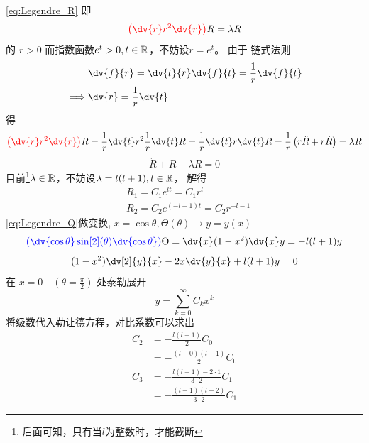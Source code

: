 \cref{eq:Legendre_R} 即
\begin{equation}
  \red{\left(\dv{r} r^2 \dv{r} \right) } R = \lambda R 
\end{equation}
的 $r> 0$ 而指数函数\(e^t>0, t\in {\mathbb{R}}\)，不妨设\(r=e^t\)。
由于
链式法则
\begin{equation}
  \begin{aligned}
  &\dv{f}{r}= \dv{t}{r} \dv{f}{t} = \frac{1}{r} \dv{f}{t} \\
  \implies &\dv{r}=\frac{1}{r} \dv{t}
  \end{aligned}
\end{equation}
得
\begin{equation}
  \red{\left(\dv{r} r^2 \dv{r} \right) } R=
\frac{1}{r} \dv{t} r^2 \frac{1}{r} \dv{t} R
=
\frac{1}{r} \dv{t} r\dv{t} R
= \frac{1}{r} \left( r \ddot{R} + r \dot{R} \right) = \lambda R
\end{equation}
\begin{equation}
\ddot{R} + \dot{R} - \lambda R = 0
\end{equation}
目前\footnote{后面可知，只有当\(l\)为整数时，才能截断}\(\lambda \in {\mathbb{R}}\)，不妨设\(\lambda = l(l+1), l \in {\mathbb{R}}\)，
解得
\begin{subequations}
  \begin{align}
  &R_1 = C_1 e^{lt} = C_1 r^l \\
  &R_2 = C_2 e^{(-l-1)t} = C_2 r^{-l-1}
\end{align}
\end{subequations}
\cref{eq:Legendre_Q}做变换, \(x = \cos \theta, \Theta(\theta) \to y=y(x) \)
\begin{equation}
  \blue{\left( \dv{\cos \theta} \sin[2](\theta) \dv{\cos \theta} \right)} \Theta =
  \dv{x} (1-x^2) \dv{x} y = - l(l+1) y
\end{equation}
\begin{equation}
  (1-x^2) \dv[2]{y}{x} - 2 x \dv{y}{x} + l(l+1)y = 0
\end{equation}
在 \(x=0 \quad (\theta= \frac{\pi}{2})\) 处泰勒展开
\begin{equation}
  y=\sum_{k=0}^\infty C_k x^k
\end{equation}
将级数代入勒让德方程，对比系数可以求出
\begin{equation}
  \begin{aligned}
    C_2 &= - \frac{l(l+1)}{2} C_0  \\
        &= - \frac{(l-0)(l+1)}{2} C_0
  \end{aligned}
\end{equation}
\begin{equation}
  \begin{aligned}
    C_3&= -\frac{l(l+1) -2 \cdot 1 }{3 \cdot 2} C_1 \\
&= -\frac{(l-1)(l+2)}{3 \cdot 2} C_1
  \end{aligned}
\end{equation}
